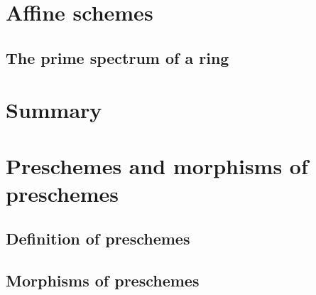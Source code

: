 \documentclass[10pt,oneside]{amsart}
\begin{document}
    \section{Affine schemes}
       
       \subsection{The prime spectrum of a ring}



    \section*{Summary}
    

    \section{Preschemes and morphisms of preschemes}

        \subsection{Definition of preschemes}
        

        \subsection{Morphisms of preschemes}
        
\end{document}
